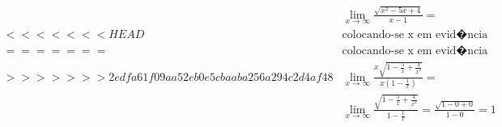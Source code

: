 \begin{ex}
\begin{align}
&\lim_{x\rightarrow \infty} \frac{\sqrt{x^2-5x+4}}{x-1}=\nonumber\\
<<<<<<< HEAD
&\text{colocando-se x em evid�ncia no numerador e no denominador, temos:}\nonumber\\
=======
&\text{colocando-se x em evid�ncia no numerador e no denominador, temos:}\nonumber\\
>>>>>>> 2edfa61f09aa52eb0e5cbaaba256a294c2d4af48
&\lim_{x\rightarrow \infty} \frac{x\sqrt{1-\frac{5}{x}+\frac{4}{x^2}}}{x(1-\frac{1}{x})}=\nonumber\\
&\lim_{x\rightarrow \infty} \frac{\sqrt{1-\frac{5}{x}+\frac{4}{x^2}}}{1-\frac{1}{x}}=\frac{\sqrt{1-0+0}}{1-0}=1\nonumber
\end{align}
\end{ex}
